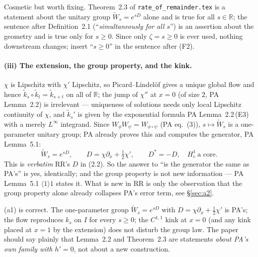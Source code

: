 \documentclass[11pt]{article}
\newcommand{\Wt}{\widetilde W}\newcommand{\kt}{\widetilde k}
\begin{document}
\begin{verdictgap}
Cosmetic but worth fixing.  Theorem~2.3 of \texttt{rate\_of\_remainder.tex} is a statement about the
unitary group $\Wt_s=e^{sD}$ alone and is true for all $s\in\mathbb R$; the sentence after
Definition~2.1 (``\emph{simultaneously for all $s$}'') is an assertion about the geometry and is true
only for $s\ge0$.  Since only $\zeta=s\ge0$ is ever used, nothing downstream changes; insert
``$s\ge0$'' in the sentence after (F2).
\end{verdictgap}

\paragraph{(iii) The extension, the group property, and the kink.}  $\chi$ is Lipschitz with
$\chi'$ Lipschitz, so Picard--Lindel\"of gives a unique global flow and hence
$\kt_s\circ\kt_t=\kt_{s+t}$ on all of $\mathbb R$; the jump of $\chi''$ at $x=0$ (of size $2$, PA
Lemma~2.2) is irrelevant --- uniqueness of solutions needs only local Lipschitz continuity of
$\chi$, and $\kt_s'$ is given by the exponential formula PA Lemma~2.2\,(E3) with a merely
$L^\infty$ integrand.  Since $W_\phi W_\psi=W_{\phi\circ\psi}$ (PA eq.~(3)), $s\mapsto\Wt_s$ is a
one-parameter unitary group; PA already proves this and computes the generator, PA Lemma~5.1:
\[
 \Wt_s=e^{sD},\qquad D=\chi\partial_x+\tfrac12\chi',\qquad D^*=-D,\quad H^1_c\ \text{a core}.
\]
This is \emph{verbatim} RR's $D$ in (2.2).  So the answer to ``is the generator the same as PA's''
is yes, identically; and the group property is not new information --- PA Lemma~5.1
$\langle1\rangle1$ states it.  What is new in RR is only the observation that the group property
alone already collapses PA's error term, see \S\ref{sec:a2}.

\begin{verdictok}
(a1) is correct.  The one-parameter group $\Wt_s=e^{sD}$ with $D=\chi\partial_x+\frac12\chi'$ is
PA's; the flow reproduces $k_s$ on $I$ for every $s\ge0$; the $C^{1,1}$ kink at $x=0$ (and any kink
placed at $x=1$ by the extension) does not disturb the group law.  The paper should say plainly that
Lemma~2.2 and Theorem~2.3 are statements \emph{about PA's own family with $h'=0$}, not about a new
construction.
\end{verdictok}
\end{document}

